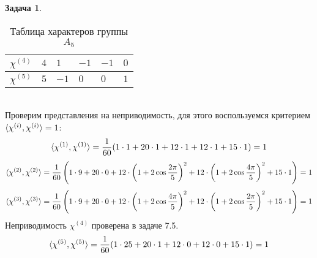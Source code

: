 \documentclass[12pt]{article}
\theoremstyle{definition}
\newtheorem{zad}{Задача}[section]
\begin{document}
\begin{zad}
\begin{itemize}
\begin{table}[h!]
\begin{tabular}{|l|l|l|l|l|l|}
    $\chi^{(4)}$ & $4$ & $1$ & $-1$ & $-1$ & $0$ \\ \hline
    $\chi^{(5)}$ & $5$ & $-1$ & $0$ & $0$ & $1$  \\ \hline
    \end{tabular}
    \caption{Таблица характеров группы $A_5$}
    \end{table}\\
Проверим представления на неприводимость, для этого воспользуемся критерием $\braket{\chi^{(i)},\chi^{(i)}}=1$:
\begin{equation}
    \braket{\chi^{(1)},\chi^{(1)}}=\frac{1}{60}(1\cdot1+20\cdot1+12\cdot1+12\cdot1+15\cdot1)=1
\end{equation}
\begin{equation}
    \braket{\chi^{(2)},\chi^{(2)}}=\frac{1}{60}\left(1\cdot9+20\cdot0+12\cdot\left(1+2\cos\frac{2\pi}{5}\right)^2+12\cdot\left(1+2\cos\frac{4\pi}{5}\right)^2+15\cdot1\right)=1
\end{equation}
\begin{equation}
    \braket{\chi^{(3)},\chi^{(3)}}=\frac{1}{60}\left(1\cdot9+20\cdot0+12\cdot\left(1+2\cos\frac{4\pi}{5}\right)^2+12\cdot\left(1+2\cos\frac{2\pi}{5}\right)^2+15\cdot1\right)=1
\end{equation}
Неприводимость $\chi^{(4)}$ проверена в задаче 7.5.
\begin{equation}
    \braket{\chi^{(5)},\chi^{(5)}}=\frac{1}{60}(1\cdot25+20\cdot1+12\cdot0+12\cdot0+15\cdot1)=1
\end{equation}
\end{itemize}
\end{zad}
\end{document}
